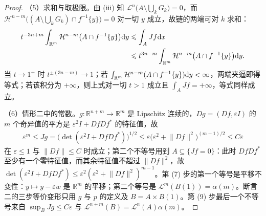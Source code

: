 \documentclass[../../main.tex]{subfiles}%
\begin{document}
\begin{proof}
（5）求和与取极限。由 (iii) 知 $\mathcal{L}^n\bigl(A\setminus\bigcup_kG_k\bigr)=0$，而 $\mathcal{H}^{n-m}\bigl((A\setminus\bigcup_kG_k)\cap f^{-1}\{y\}\bigr)=0$ 对一切 $y$ 成立，故链的两端可对 $k$ 求和：
\begin{align*}
t^{-3n+m}\int_{\mathbb{R}^m}\mathcal{H}^{n-m}\bigl(A\cap f^{-1}\{y\}\bigr)\mathrm{d} y&\leqslant\int_AJf\mathrm{d} x\\
&\leqslant t^{3n-m}\int_{\mathbb{R}^m}\mathcal{H}^{n-m}\bigl(A\cap f^{-1}\{y\}\bigr)\mathrm{d} y.
\end{align*}
当 $t\to1^+$ 时 $t^{\pm(3n-m)}\to1$；若 $\int_{\mathbb{R}^m}\mathcal{H}^{n-m}(A\cap f^{-1}\{y\})\mathrm{d} y<\infty$，两端夹逼即得等式；若该积分为 $+\infty$，则上式对一切 $t>1$ 成立且 $\int_AJf=+\infty$，等式同样成立。

（6）情形二中的常数。$g:\mathbb{R}^{n+m}\to\mathbb{R}^m$ 是 Lipschitz 连续的，$Dg=(Df,\varepsilon I)$ 的 $m$ 个奇异值的平方是 $\varepsilon^2I+DfDf^*$ 的特征值，故
\begin{align*}
\varepsilon^m\leqslant Jg=\bigl(\det(\varepsilon^2I+DfDf^*)\bigr)^{1/2}\leqslant\varepsilon\bigl(\varepsilon^2+\lVert Df\rVert^2\bigr)^{(m-1)/2}\leqslant C\varepsilon
\end{align*}
在 $\varepsilon\leqslant1$ 与 $\lVert Df\rVert\leqslant C$ 时成立；第二个不等号用到 $A\subseteq\{Jf=0\}$：此时 $DfDf^*$ 至少有一个零特征值，而其余特征值不超过 $\lVert Df\rVert^2$，故 $\det(\varepsilon^2I+DfDf^*)\leqslant\varepsilon^2(\varepsilon^2+\lVert Df\rVert^2)^{m-1}$。第 (7) 步的第一个等号是平移不变性：$y\mapsto y-\varepsilon w$ 是 $\mathbb{R}^m$ 的平移；第二个等号是 $\mathcal{L}^m(B(1))=\alpha(m)$。断言二的三步等价变形只用 $g$ 与 $p$ 的定义及 $B=A\times B(1)$。第 (9) 步最后一个不等号来自 $\sup_BJg\leqslant C\varepsilon$ 与 $\mathcal{L}^{n+m}(B)=\mathcal{L}^n(A)\alpha(m)$。
\end{proof}
\end{document}
